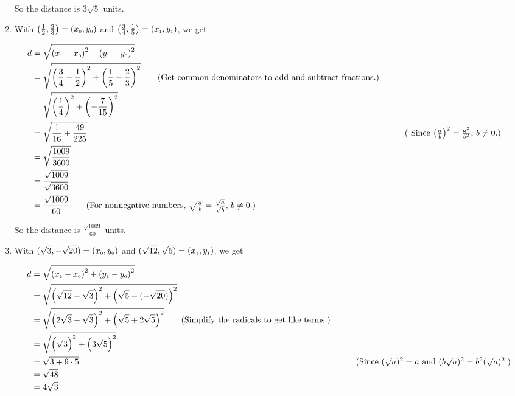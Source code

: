 \begin{ex}
\begin{enumerate}
\setlength{\extrarowheight}{2pt}

\medskip

So the distance is $3 \sqrt{5}$ units.

\item With $\left( \frac{1}{2}, \frac{2}{3}\right) =  \left(x_{\mbox{\tiny$0$}}, y_{\mbox{\tiny$0$}}\right)$ and  $\left( \frac{3}{4}, \frac{1}{5}\right) = \left(x_{\mbox{\tiny$1$}}, y_{\mbox{\tiny$1$}}\right)$, we get

\setlength{\extrarowheight}{3pt}

\begin{align*}
 d & = \sqrt{\left(x_{\mbox{\tiny$1$}} - x_{\mbox{\tiny$0$}} \right)^2 + \left(y_{\mbox{\tiny$1$}} - y_{\mbox{\tiny$0$}} \right)^2} \\
   & = \sqrt{ \left(\frac{3}{4}-\frac{1}{2} \right)^2 + \left(\frac{1}{5} - \frac{2}{3} \right)^2} \tag{Get common denominators to add and subtract fractions.}\\
   & = \sqrt{\left(\frac{1}{4} \right)^2 + \left(-\frac{7}{15} \right)^2} \\
   & = \sqrt{\frac{1}{16} + \frac{49}{225}} &&  \tag{ Since $\left(\frac{a}{b}\right)^2 = \frac{a^2}{b^2}$, $b \neq 0$.}\\
   & = \sqrt{\frac{1009}{3600}} \\
   & = \frac{\sqrt{1009}}{\sqrt{3600}} \\
   & = \frac{\sqrt{1009}}{60} \tag{For nonnegative numbers, $\sqrt{\frac{a}{b}} = \frac{\sqrt{a}}{\sqrt{b}}$, $b \neq 0$.}
\end{align*}

\setlength{\extrarowheight}{2pt}

\medskip

So the distance is $\frac{\sqrt{1009}}{60}$ units.

\item With $(\sqrt{3}, -\sqrt{20}) =  \left(x_{\mbox{\tiny$0$}}, y_{\mbox{\tiny$0$}}\right)$ and  $(\sqrt{12}, \sqrt{5}) = \left(x_{\mbox{\tiny$1$}}, y_{\mbox{\tiny$1$}}\right)$, we get

\setlength{\extrarowheight}{3pt}

\begin{align*}
 d & = \sqrt{\left(x_{\mbox{\tiny$1$}} - x_{\mbox{\tiny$0$}} \right)^2 + \left(y_{\mbox{\tiny$1$}} - y_{\mbox{\tiny$0$}} \right)^2} \\
   & = \sqrt{ \left(\sqrt{12}- \sqrt{3} \right)^2 + \left(\sqrt{5} - (-\sqrt{20})\right)^2} \\
   & = \sqrt{\left(2\sqrt{3} - \sqrt{3} \right)^2 + \left(\sqrt{5}+2\sqrt{5} \right)^2} \tag{Simplify the radicals to get like terms.}\\
   & = \sqrt{\left(\sqrt{3}\right)^2 + \left(3 \sqrt{5}\right)^2} \\
   & = \sqrt{3 + 9 \cdot 5} & \tag{Since $(\sqrt{a})^2 = a$ and $(b \sqrt{a})^2 = b^2 (\sqrt{a})^2$.} \\
   & = \sqrt{48} \\
   & = 4\sqrt{3}
\end{align*}


\end{enumerate}
\end{ex}
